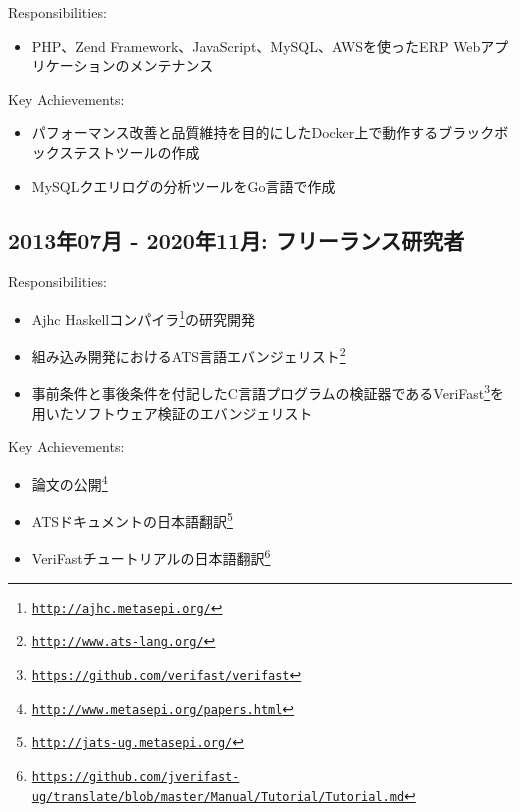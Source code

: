 \documentclass[letterpaper]{article}
\begin{document}
\noindent Responsibilities:

\begin{itemize}
  \item PHP、Zend Framework、JavaScript、MySQL、AWSを使ったERP Webアプリケーションのメンテナンス
\end{itemize}

\noindent Key Achievements:

\begin{itemize}
  \item パフォーマンス改善と品質維持を目的にしたDocker上で動作するブラックボックステストツールの作成
  \item MySQLクエリログの分析ツールをGo言語で作成
\end{itemize}

\subsection*{2013年07月 - 2020年11月: フリーランス研究者}

\noindent Responsibilities:

\begin{itemize}
  \item Ajhc Haskellコンパイラ\footnote{\href{http://ajhc.metasepi.org/}{\tt http://ajhc.metasepi.org/}}の研究開発
  \item 組み込み開発におけるATS言語エバンジェリスト\footnote{\href{http://www.ats-lang.org/}{\tt http://www.ats-lang.org/}}
  \item 事前条件と事後条件を付記したC言語プログラムの検証器であるVeriFast\footnote{\href{https://github.com/verifast/verifast}{\tt https://github.com/verifast/verifast}}を用いたソフトウェア検証のエバンジェリスト
\end{itemize}

\noindent Key Achievements:

\begin{itemize}
  \item 論文の公開\footnote{\href{http://www.metasepi.org/papers.html}{\tt http://www.metasepi.org/papers.html}}
  \item ATSドキュメントの日本語翻訳\footnote{\href{http://jats-ug.metasepi.org/}{\tt http://jats-ug.metasepi.org/}}
  \item VeriFastチュートリアルの日本語翻訳\footnote{\href{https://github.com/jverifast-ug/translate/blob/master/Manual/Tutorial/Tutorial.md}{\tt https://github.com/jverifast-ug/translate/blob/master/Manual/Tutorial/Tutorial.md}}
\end{itemize}
\end{document}

